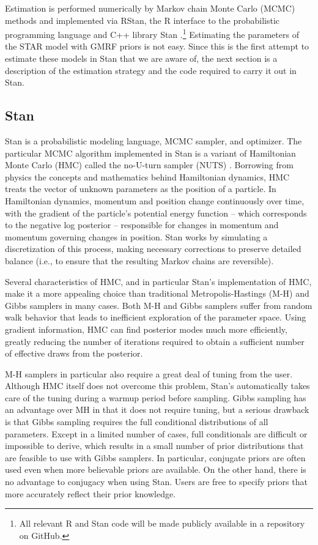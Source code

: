 Estimation is performed numerically by Markov chain Monte Carlo (MCMC) methods and implemented via RStan, the R interface to the probabilistic programming language and C++ library Stan .\footnote{All relevant R and Stan code will be made publicly available in a repository on GitHub.} Estimating the parameters of the STAR model with GMRF priors is not easy. Since this is the first attempt to estimate these models in Stan that we are aware of, the next section is a description of the estimation strategy and the code required to carry it out in Stan.


\subsection{Stan} 

Stan is a probabilistic modeling language, MCMC sampler, and optimizer. The particular MCMC algorithm implemented in Stan is a variant of Hamiltonian Monte Carlo (HMC) called the no-U-turn sampler (NUTS) . Borrowing from physics the concepts and mathematics behind Hamiltonian dynamics, HMC treats the vector of unknown parameters as the position of a particle. In Hamiltonian dynamics, momentum and position change continuously over time, with the gradient of the particle's potential energy function --  which corresponds to the negative log posterior -- responsible for changes in momentum and momentum governing changes in position. Stan works by simulating a discretization of this process, making necessary corrections to preserve detailed balance (i.e., to ensure that the resulting Markov chains are reversible). 

Several characteristics of HMC, and in particular Stan's implementation of HMC, make it a more appealing choice than traditional Metropolis-Hastings (M-H) and Gibbs samplers in many cases. Both M-H and Gibbs samplers suffer from random walk behavior that leads to inefficient exploration of the parameter space. Using gradient information, HMC can find posterior modes much more efficiently, greatly reducing the number of iterations required to obtain a sufficient number of effective draws from the posterior. 

M-H samplers in particular also require a great deal of tuning from the user. Although HMC itself does not overcome this problem, Stan's automatically takes care of the tuning during a warmup period before sampling. Gibbs sampling has an advantage over MH in that it does not require tuning, but a serious drawback is that Gibbs sampling requires the full conditional distributions of all parameters. Except in a limited number of cases, full conditionals are difficult or impossible to derive, which results in a small number of prior distributions that are feasible to use with Gibbs samplers. In particular, conjugate priors are often used even when more believable priors are available. On the other hand, there is no advantage to conjugacy when using Stan. Users are free to specify priors that more accurately reflect their prior knowledge. 

